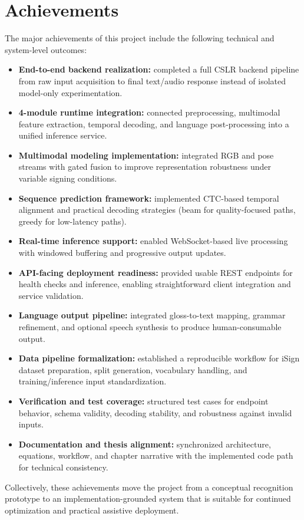 \section{Achievements}
The major achievements of this project include the following technical and system-level outcomes:

\begin{itemize}[leftmargin=1.5em]
\item \textbf{End-to-end backend realization:} completed a full CSLR backend pipeline from raw input acquisition to final text/audio response instead of isolated model-only experimentation.
\item \textbf{4-module runtime integration:} connected preprocessing, multimodal feature extraction, temporal decoding, and language post-processing into a unified inference service.
\item \textbf{Multimodal modeling implementation:} integrated RGB and pose streams with gated fusion to improve representation robustness under variable signing conditions.
\item \textbf{Sequence prediction framework:} implemented CTC-based temporal alignment and practical decoding strategies (beam for quality-focused paths, greedy for low-latency paths).
\item \textbf{Real-time inference support:} enabled WebSocket-based live processing with windowed buffering and progressive output updates.
\item \textbf{API-facing deployment readiness:} provided usable REST endpoints for health checks and inference, enabling straightforward client integration and service validation.
\item \textbf{Language output pipeline:} integrated gloss-to-text mapping, grammar refinement, and optional speech synthesis to produce human-consumable output.
\item \textbf{Data pipeline formalization:} established a reproducible workflow for iSign dataset preparation, split generation, vocabulary handling, and training/inference input standardization.
\item \textbf{Verification and test coverage:} structured test cases for endpoint behavior, schema validity, decoding stability, and robustness against invalid inputs.
\item \textbf{Documentation and thesis alignment:} synchronized architecture, equations, workflow, and chapter narrative with the implemented code path for technical consistency.
\end{itemize}

Collectively, these achievements move the project from a conceptual recognition prototype to an implementation-grounded system that is suitable for continued optimization and practical assistive deployment.
